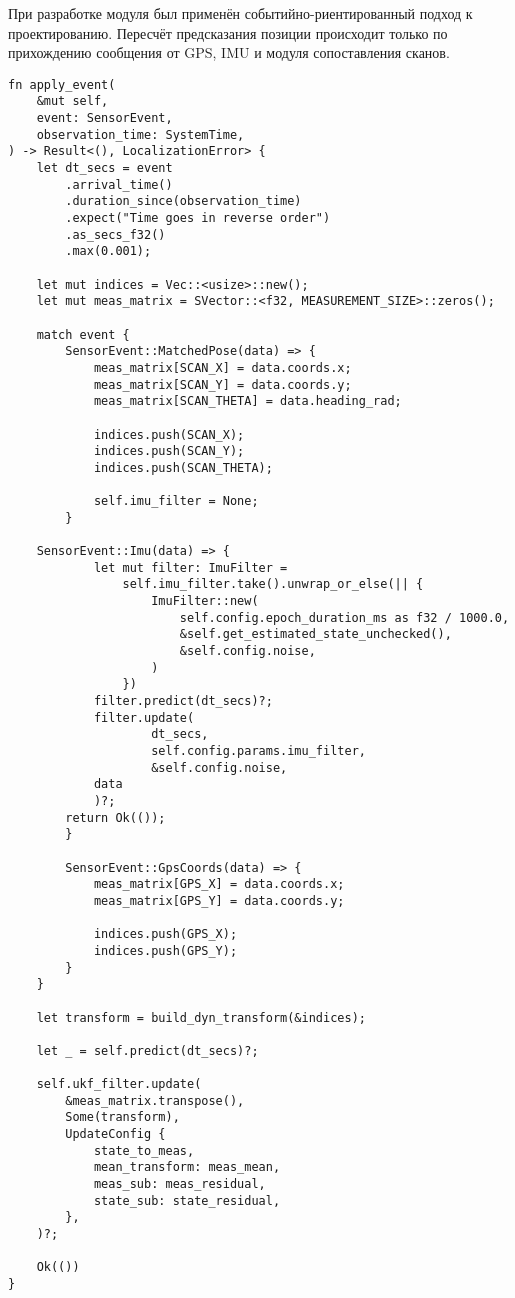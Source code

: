 При разработке модуля был применён событийно-риентированный подход к проектированию. Пересчёт предсказания позиции происходит только по прихождению сообщения от GPS, IMU и модуля сопоставления сканов.

\begin{lstlisting}
fn apply_event(
    &mut self,
    event: SensorEvent,
    observation_time: SystemTime,
) -> Result<(), LocalizationError> {
    let dt_secs = event
        .arrival_time()
        .duration_since(observation_time)
        .expect("Time goes in reverse order")
        .as_secs_f32()
        .max(0.001);

    let mut indices = Vec::<usize>::new();
    let mut meas_matrix = SVector::<f32, MEASUREMENT_SIZE>::zeros();

    match event {
        SensorEvent::MatchedPose(data) => {
            meas_matrix[SCAN_X] = data.coords.x;
            meas_matrix[SCAN_Y] = data.coords.y;
            meas_matrix[SCAN_THETA] = data.heading_rad;

            indices.push(SCAN_X);
            indices.push(SCAN_Y);
            indices.push(SCAN_THETA);

            self.imu_filter = None;
        }

	SensorEvent::Imu(data) => {
            let mut filter: ImuFilter =
                self.imu_filter.take().unwrap_or_else(|| {
                    ImuFilter::new(
                        self.config.epoch_duration_ms as f32 / 1000.0,
                        &self.get_estimated_state_unchecked(),
                        &self.config.noise,
                    )
                })
            filter.predict(dt_secs)?;
            filter.update(
                    dt_secs,
                    self.config.params.imu_filter,
                    &self.config.noise,
		    data
            )?;
	    return Ok(());
        }

        SensorEvent::GpsCoords(data) => {
            meas_matrix[GPS_X] = data.coords.x;
            meas_matrix[GPS_Y] = data.coords.y;

            indices.push(GPS_X);
            indices.push(GPS_Y);
        }
    }

    let transform = build_dyn_transform(&indices);

    let _ = self.predict(dt_secs)?;

    self.ukf_filter.update(
        &meas_matrix.transpose(),
        Some(transform),
        UpdateConfig {
            state_to_meas,
            mean_transform: meas_mean,
            meas_sub: meas_residual,
            state_sub: state_residual,
        },
    )?;

    Ok(())
}

\end{lstlisting}



